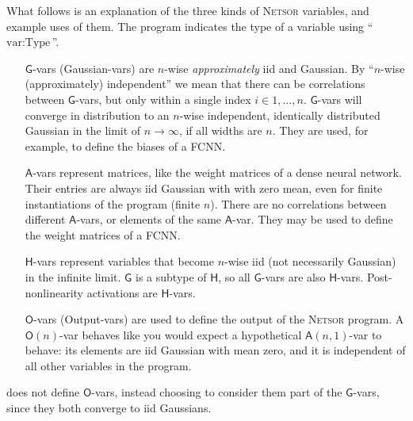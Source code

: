 \documentclass[accepted]{uai2021} %
\newcommand{\Netsor}{\textsc{Netsor}\xspace}
\newcommand{\Gva}{\mathsf{G}}
\newcommand{\Hva}{\mathsf{H}}
\newcommand{\Ava}{\mathsf{A}}
\newcommand{\Ova}{\mathsf{O}}
\newcommand{\0}{\boldsymbol{0}}
\newcommand{\1}{\boldsymbol{1}}
\begin{document}
What follows is an explanation of the three kinds of \Netsor variables, and
example uses of them. The program indicates the type of a variable using
``$\text{var} : \text{Type}$''.
\begin{itemize}
\item[$\Gva$-vars] (Gaussian-vars) are $n$-wise \emph{approximately}
\ac{iid} and Gaussian. By ``$n$-wise (approximately) independent'' we mean that there can be
correlations between $\Gva$-vars, but only within a single index $i \in 1,\dots,n$.
$\Gva$-vars will converge in
distribution to an $n$-wise independent, identically distributed Gaussian in the limit of $n \to \infty$, if
all widths are $n$. They are used, for example, to define the biases of a \ac{FCNN}.

\item[$\Ava$-vars] represent matrices,
like the weight matrices of a dense neural network. Their entries are always \ac{iid}
Gaussian with with zero mean, even for finite instantiations of the program
(finite $n$).
There are no correlations between different $\Ava$-vars, or elements of the same $\Ava$-var. They may be used to define the weight matrices of a \ac{FCNN}.

\item[$\Hva$-vars] represent variables that become $n$-wise \ac{iid} (not necessarily
Gaussian) in the
infinite limit. $\Gva$ is a subtype of $\Hva$, so all $\Gva$-vars are also $\Hva$-vars. Post-nonlinearity activations are $\Hva$-vars.

\item[$\Ova$-vars] (Output-vars) are used to define the output of the \Netsor
program. A $\Ova(n)$-var behaves like you would expect a hypothetical $\Ava(n, 1)$-var to behave: its elements are \ac{iid} Gaussian with mean zero, and it is independent of all other variables in the program.
\end{itemize}

\citet{yang2019wide} does not define $\Ova$-vars, instead choosing to consider them part of the $\Gva$-vars, since they both converge to \ac{iid} Gaussians.
\end{document}
